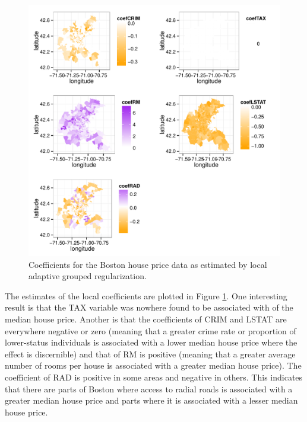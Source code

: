 \documentclass[authoryear,review, 12pt]{elsarticle}
\newcommand{\maxwidth}{\textwidth}
\begin{document}
\begin{figure}

\includegraphics[width=\maxwidth]{figure/boston-plots} 


\caption{Coefficients for the Boston house price data as estimated by local adaptive grouped regularization.\label{fig:boston-lagr-coefs}}
\end{figure}

The estimates of the local coefficients are plotted in Figure \ref{fig:boston-lagr-coefs}.
One interesting result is that the TAX variable was nowhere found
to be associated with of the median house price. Another is that the
coefficients of CRIM and LSTAT are everywhere negative or zero (meaning
that a greater crime rate or proportion of lower-status individuals
is associated with a lower median house price where the effect is
discernible) and that of RM is positive (meaning that a greater average
number of rooms per house is associated with a greater median house
price). The coefficient of RAD is positive in some areas and negative
in others. This indicates that there are parts of Boston where access
to radial roads is associated with a greater median house price and
parts where it is associated with a lesser median house price.
\end{document}
